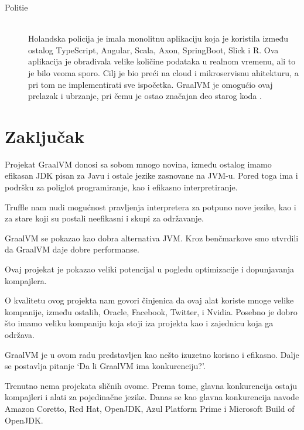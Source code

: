 \documentclass[a4paper]{article}
\begin{document}
\begin{description}
	\item[Politie]  \hfill \\
	Holandska policija je imala monolitnu aplikaciju koja je koristila između ostalog TypeScript, Angular, Scala, Axon, SpringBoot, Slick i R. Ova aplikacija je obrađivala velike količine podataka u realnom vremenu, ali to je bilo veoma sporo. Cilj je bio preći na cloud i mikroservisnu ahitekturu, a pri tom ne implementirati sve ispočetka. GraalVM je omogućio ovaj prelazak i ubrzanje, pri čemu je ostao značajan deo starog koda \cite{graalvmusecases}.
\end{description}

\section{Zaključak}
\label{sec:zakljucak}


Projekat GraalVM donosi sa sobom mnogo novina, između ostalog imamo efikasan JDK pisan za Javu i ostale jezike zasnovane na JVM-u. Pored toga ima i podršku za poliglot programiranje, kao i efikasno interpretiranje. 

Truffle nam nudi mogućnost pravljenja interpretera za potpuno nove jezike, kao i za stare koji su postali neefikasni i skupi za održavanje.

GraalVM se pokazao kao dobra alternativa JVM. Kroz benčmarkove smo utvrdili da GraalVM daje dobre performanse. 

Ovaj projekat je pokazao veliki potencijal u pogledu optimizacije i dopunjavanja kompajlera.

O kvalitetu ovog projekta nam govori činjenica da ovaj alat koriste mnoge velike kompanije, između ostalih, Oracle, Facebook, Twitter, i Nvidia. Posebno je dobro što imamo veliku kompaniju koja stoji iza projekta kao i zajednicu koja ga održava.

GraalVM je u ovom radu predstavljen kao nešto izuzetno korisno i efikasno. Dalje se postavlja pitanje `Da li GraalVM ima konkurenciju?'.

Trenutno nema projekata sličnih ovome. Prema tome, glavna konkurencija ostaju kompajleri i alati za pojedinačne jezike. Danas se kao glavna konkurencija navode Amazon Coretto, Red Hat, OpenJDK, Azul Platform Prime i Microsoft Build of OpenJDK. 

\appendix
 

\end{document}

